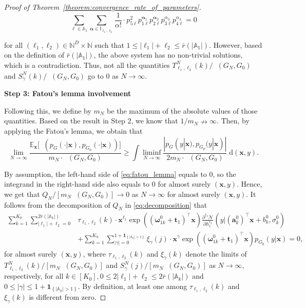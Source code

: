 \documentclass[twoside]{article}
\DeclareMathOperator*{\VD}{D_{V}}
\DeclareMathOperator*{\TV}{D_{TV}}
\theoremstyle{plain}
\theoremstyle{definition}
\theoremstyle{plain}
\def\rvx{{\mathbf{x}}}
\def\valpha{{\bm{\alpha}}}
\def\vomega{{\bm{\omega}}}
\def\vell{{\bm{\ell}}}
\def\va{{\bm{a}}}
\def\vt{{\bm{t}}}
\def\vx{{\bm{x}}}
\def\sA{{\mathbb{A}}}
\def\sI{{\mathbb{I}}}
\newcommand{\bbE}{\mathbb{E}}
\newcommand{\cN}{\mathcal{N}}
\begin{document}
\begin{proof}[Proof of Theorem~\ref{theorem:convergence_rate_of_parameters}]
\[
\sum_{\ell \in \sA_{1}} \sum_{\valpha \in \sI_{\vell_{1}, \ell_{2}}} \frac{1}{\alpha!} \cdot p_{5 \ell}^{2} p_{1 \ell}^{\valpha_{1}} p_{2 \ell}^{\valpha_{2}} p_{3 \ell}^{\alpha_{3}} p_{4 \ell}^{\alpha_{4}}=0
\]

for all $\left(\vell_{1}, \ell_{2}\right) \in \mathbb{N}^{D} \times \mathbb{N}$ such that $1 \leq\left|\vell_{1}\right|+\ell_{2} \leq \bar{r}\left(\left|\sA_{1}\right|\right)$. However, based on the definition of $\bar{r}\left(\left|\sA_{1}\right|\right)$, the above system has no non-trivial solutions, which is a contradiction. Thus, not all the quantities $T_{\vell_{1}, \ell_{2}}^{N}(k) / \VD (G_N, G_0)$ and $S_{\gamma}^{N}(k) / \VD (G_N, G_0)$ go to $0$ as $N \to \infty$.

\textbf{Step 3: Fatou's lemma involvement}

Following this, we define by $m_{N}$ be the maximum of the absolute values of those quantities. Based on the result in Step 2, we know that $1 / m_{N} \nrightarrow \infty$. Then, by applying the Fatou's lemma, we obtain that
\begin{equation}
    \lim_{N \to \infty} \frac{\bbE_\rvx\big[\TV(p_G(\cdot|\vx),p_{G_0}(\cdot|\vx))\big]}{m_N \cdot \VD(G_N, G_0)} \ge \int \liminf_{N \to \infty} \frac{|p_G(y|\vx),p_{G_0}(y|\vx)|}{2m_N \cdot \VD (G_N, G_0)}\;\mathrm{d}(\vx, y).\label{eq:fatou_lemma}
\end{equation}


By assumption, the left-hand side of \cref{eq:fatou_lemma} equals to $0$, so the integrand in the right-hand side also equals to $0$ for almost surely $(\vx, y)$. Hence, we get that $Q_{N} /\left[m_{N} \VD (G_N, G_0)\right] \to 0$ as $N \to \infty$ for almost surely $(\vx, y)$. It follows from the decomposition of $Q_{N}$ in \cref{eq:decomposition} that
\begin{align}
\sum_{k=1}^{K_0} \sum_{\left|\vell_{1}\right|+\ell_{2}=0}^{2 \bar{r}\left(\left|\sA_k\right|\right)} & \tau_{\vell_{1}, \ell_{2}}(k) \cdot \vx^{\vell_{1}} \exp \left(\left(\vomega_{1 k}^{0}+\vt_{1}\right)^{\top} \vx\right) \frac{\partial^{\ell_{2}} \cN}{\partial h_{1}^{\ell_{2}}}\left(y|\left(\va_{k}^{0}\right)^{\top} \vx+b_{k}^{0}, \sigma_{k}^{0}\right) \nonumber\\
& +\sum_{k=1}^{K_0} \sum_{|\gamma|=0}^{1+\mathbf{1}_{\left\{\left|\sA_k\right|>1\right\}}} \xi_{\gamma}(j) \cdot \vx^{\gamma} \exp \left(\left(\vomega_{1 k}^{0}+\vt_{1}\right)^{\top} \vx\right) p_{G_{0}}(y|\vx)=0, \nonumber
\end{align}
for almost surely $(\vx, y)$, where $\tau_{\vell_{1}, \ell_{2}}(k)$ and $\xi_{\gamma}(k)$ denote the limits of $T_{\vell_{1}, \ell_{2}}^{N}(k) /\left[m_{N} \VD (G_N, G_0)\right]$ and $S_{\gamma}^{N}(j) /\left[m_{N} \VD (G_N, G_0)\right]$ as $N \to \infty$, respectively, for all $k \in\left[K_0\right], 0 \leq 2\left|\vell_{1}\right|+\ell_{2} \leq 2 \bar{r}\left(\left|\sA_k\right|\right)$ and $0 \leq|\gamma| \leq 1+\mathbf{1}_{\left\{\left|\sA_k\right|>1\right\}}$. By definition, at least one among $\tau_{\ell_{1}, \ell_{2}}(k)$ and $\xi_{\gamma}(k)$ is different from zero. 


\end{proof}
\end{document}

